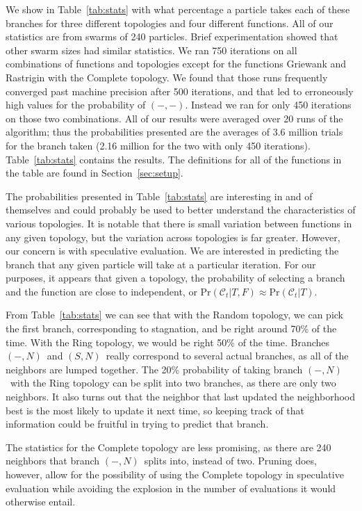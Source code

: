 \documentclass[smallcondensed]{svjour3}
\renewcommand{\sec}[1]{Section~\ref{sec:#1}}
\providecommand{\caseset}{\ensuremath{\mathcal{C}}}
\providecommand{\casepn}{\ensuremath{(-,-)}}
\providecommand{\casepN}{\ensuremath{(-,N)}}
\providecommand{\casexN}{\ensuremath{(S,N)}}
\providecommand{\prob}{\ensuremath{\mathrm{Pr}}}
\begin{document}
We show in Table~\ref{tab:stats} with what percentage a particle takes each of
these branches for three different topologies and four different functions.
All of our statistics are from swarms of 240 particles.  Brief experimentation
showed that other swarm sizes had similar statistics.  We ran 750 iterations on
all combinations of functions and topologies except for the functions Griewank
and Rastrigin with the Complete topology.  We found that those runs frequently
converged past machine precision after 500 iterations, and that led to
erroneously high values for the probability of \casepn.  Instead we ran for
only 450 iterations on those two combinations.  All of our results were
averaged over 20 runs of the algorithm; thus the probabilities presented are
the averages of 3.6 million trials for the branch taken (2.16 million for the
two with only 450 iterations).  Table~\ref{tab:stats} contains the results.
The definitions for all of the functions in the table are found in \sec{setup}.

The probabilities presented in Table~\ref{tab:stats} are interesting in and of
themselves and could probably be used to better understand the characteristics
of various topologies.  It is notable that there is small variation between
functions in any given topology, but the variation across topologies is far
greater.  However, our concern is with speculative evaluation.  We are
interested in predicting the branch that any given particle will take at a
particular iteration.  For our purposes, it appears that given a topology, the
probability of selecting a branch and the function are close to independent, or
$\prob(\caseset_t|T,F) \approx \prob(\caseset_t|T)$.

From Table~\ref{tab:stats} we can see that with the Random topology, we can
pick the first branch, corresponding to stagnation, and be right around 70\% of
the time.  With the Ring topology, we would be right 50\% of the time.
Branches \casepN\ and \casexN\ really correspond to several actual branches, as
all of the neighbors are lumped together.  The 20\% probability of taking
branch \casepN\ with the Ring topology can be split into two branches, as there
are only two neighbors.  It also turns out that the neighbor that last updated
the neighborhood best is the most likely to update it next time, so keeping
track of that information could be fruitful in trying to predict that branch.

The statistics for the Complete topology are less promising, as there are 240
neighbors that branch \casepN\ splits into, instead of two.  Pruning does,
however, allow for the possibility of using the Complete topology in
speculative evaluation while avoiding the explosion in the number of
evaluations it would otherwise entail.
\end{document}

